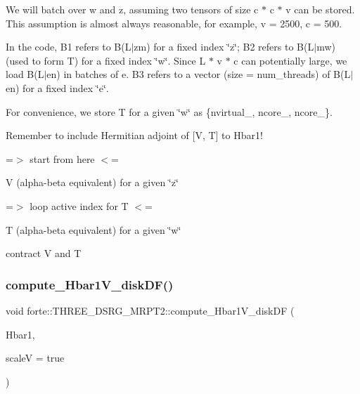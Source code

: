 \begin{DoxyEnumerate}
\item We will batch over w and z, assuming two tensors of size c $\ast$ c $\ast$ v can be stored. This assumption is almost always reasonable, for example, v = 2500, c = 500.
\item In the code, B1 refers to B(L$\vert$zm) for a fixed index \char`\"{}z\char`\"{}; B2 refers to B(L$\vert$mw) (used to form T\textquotesingle{}\textquotesingle{}) for a fixed index \char`\"{}w\char`\"{}. Since L $\ast$ v $\ast$ c can potentially large, we load B(L$\vert$en) in batches of e. B3 refers to a vector (size = num\+\_\+threads) of B(L$\vert$en) for a fixed index \char`\"{}e\char`\"{}.
\item For convenience, we store T\textquotesingle{}\textquotesingle{} for a given \char`\"{}w\char`\"{} as \{nvirtual\+\_\+, ncore\+\_\+, ncore\+\_\+\}.
\item Remember to include Hermitian adjoint of \mbox{[}V, T\mbox{]} to Hbar1!
\end{DoxyEnumerate}

=$>$ start from here $<$=

V (alpha-\/beta equivalent) for a given \char`\"{}z\char`\"{}

=$>$ loop active index for T $<$=

T (alpha-\/beta equivalent) for a given \char`\"{}w\char`\"{}

contract V and T \mbox{\label{classforte_1_1_t_h_r_e_e___d_s_r_g___m_r_p_t2_a61efa7c20b24ea08e07267f5a54ae532}} 
\subsubsection{\texorpdfstring{compute\+\_\+\+Hbar1\+V\+\_\+disk\+D\+F()}{compute\_Hbar1V\_diskDF()}}
{\footnotesize\ttfamily void forte\+::\+T\+H\+R\+E\+E\+\_\+\+D\+S\+R\+G\+\_\+\+M\+R\+P\+T2\+::compute\+\_\+\+Hbar1\+V\+\_\+disk\+DF (\begin{DoxyParamCaption}\item[{ambit\+::\+Blocked\+Tensor \&}]{Hbar1,  }\item[{bool}]{scaleV = {\ttfamily true} }\end{DoxyParamCaption})\hspace{0.3cm}{\ttfamily [protected]}}



